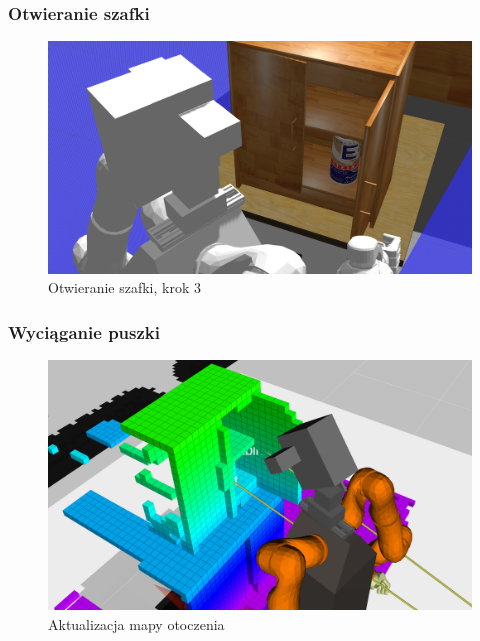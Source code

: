 \addtocounter{framenumber}{-1}
\begin{frame}
	\frametitle{Otwieranie szafki}
	\begin{figure}[b]
        \label{sim_map}
        \centering
        \def\svgwidth{\columnwidth}
        \includegraphics[scale=0.25]{images/testpuszka/otwarta_szafka.png}
        \caption{Otwieranie szafki, krok 3}
    \end{figure}
\end{frame}


\begin{frame}
	\frametitle{Wyciąganie puszki}
	\begin{figure}[b]
        \label{sim_map}
        \centering
        \def\svgwidth{\columnwidth}
        \includegraphics[scale=0.33]{images/testpuszka/wykrywanie_octomapy.png}
        \caption{Aktualizacja mapy otoczenia}
    \end{figure}
\end{frame}

